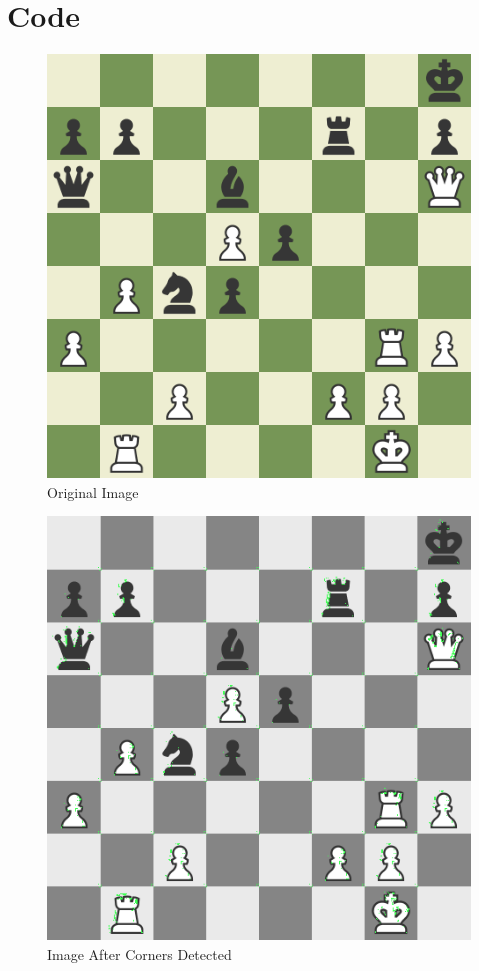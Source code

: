 \documentclass[11pt]{article}
\begin{document}
    \section{Code}\label{sec:codeExplanation}
    

    \begin{figure}[h]
        \caption{Original Image}
        \centering
        \includegraphics[scale=0.63]{dynboard.png}
    \end{figure}

    \begin{figure}[h]
        \caption{Image After Corners Detected}
        \centering
        \includegraphics[scale=0.63]{Exercise3_OutputImage.png}
    \end{figure}
\end{document}
